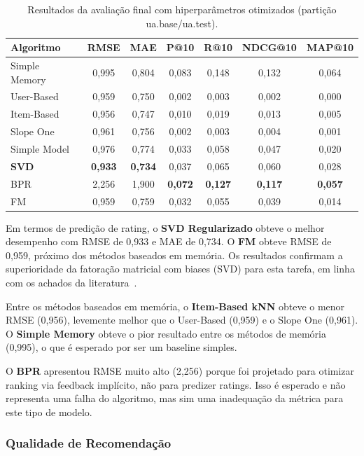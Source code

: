 \documentclass[sigconf,nonacm]{acmart}
\begin{document}
\begin{table}[h]
\caption{Resultados da avaliação final com hiperparâmetros otimizados
(partição ua.base/ua.test).}
\label{tab:results}
\small
\begin{tabular}{lcccccc}
\toprule
\textbf{Algoritmo} & \textbf{RMSE} & \textbf{MAE} & \textbf{P@10} & \textbf{R@10} & \textbf{NDCG@10} & \textbf{MAP@10} \\
\midrule
Simple Memory & 0,995 & 0,804 & 0,083 & 0,148 & 0,132 & 0,064 \\
User-Based    & 0,959 & 0,750 & 0,002 & 0,003 & 0,002 & 0,000 \\
Item-Based    & 0,956 & 0,747 & 0,010 & 0,019 & 0,013 & 0,005 \\
Slope One     & 0,961 & 0,756 & 0,002 & 0,003 & 0,004 & 0,001 \\
\midrule
Simple Model  & 0,976 & 0,774 & 0,033 & 0,058 & 0,047 & 0,020 \\
\textbf{SVD}  & \textbf{0,933} & \textbf{0,734} & 0,037 & 0,065 & 0,060 & 0,028 \\
BPR           & 2,256 & 1,900 & \textbf{0,072} & \textbf{0,127} & \textbf{0,117} & \textbf{0,057} \\
FM            & 0,959 & 0,759 & 0,032 & 0,055 & 0,039 & 0,014 \\
\bottomrule
\end{tabular}
\end{table}

Em termos de predição de rating, o \textbf{SVD Regularizado} obteve o melhor
desempenho com RMSE de 0,933 e MAE de 0,734. O \textbf{FM} obteve RMSE de
0,959, próximo dos métodos baseados em memória. Os resultados confirmam a
superioridade da fatoração matricial com biases (SVD) para esta tarefa, em
linha com os achados da literatura~\cite{koren2009}.

Entre os métodos baseados em memória, o \textbf{Item-Based kNN} obteve o menor
RMSE (0,956), levemente melhor que o User-Based (0,959) e o Slope One (0,961).
O \textbf{Simple Memory} obteve o pior resultado entre os métodos de memória
(0,995), o que é esperado por ser um baseline simples.

O \textbf{BPR} apresentou RMSE muito alto (2,256) porque foi projetado para
otimizar ranking via feedback implícito, não para predizer ratings. Isso é
esperado e não representa uma falha do algoritmo, mas sim uma inadequação da
métrica para este tipo de modelo.

\subsubsection{Qualidade de Recomendação}
\end{document}
